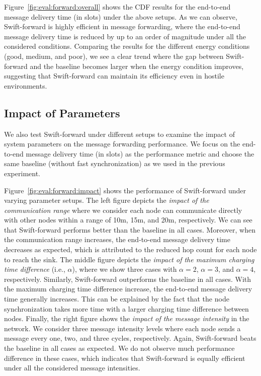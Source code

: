 \documentclass[lettersize,journal]{IEEEtran}
\newcommand{\forward}{Swift-forward\xspace}
\begin{document}
Figure~\ref{fig:eval:forward:overall} shows the CDF results for the end-to-end message delivery time (in slots) under the above setups. As we can observe, \forward is highly efficient in message forwarding, where the end-to-end message delivery time is reduced by up to an order of magnitude under all the considered conditions. Comparing the results for the different energy conditions (good, medium, and poor), we see a clear trend where the gap between \forward and the baseline becomes larger when the energy condition improves, suggesting that \forward can maintain its efficiency even in hostile environments.

\subsection{Impact of Parameters}
We also test \forward under different setups to examine the impact of system parameters on the message forwarding performance. We focus on the end-to-end message delivery time (in slots) as the performance metric and choose the same baseline (without fast synchronization) as we used in the previous experiment. 

Figure~\ref{fig:eval:forward:impact} shows the performance of \forward under varying parameter setups. The left figure depicts the \emph{impact of the communication range} where we consider each node can communicate directly with other nodes within a range of 10m, 15m, and 20m, respectively. We can see that \forward performs better than the baseline in all cases. Moreover, when the communication range increases, the end-to-end message delivery time decreases as expected, which is attributed to the reduced hop count for each node to reach the sink. The middle figure depicts the \emph{impact of the maximum charging time difference} (i.e., $\alpha$), where we show three cases with $\alpha=2$, $\alpha=3$, and $\alpha=4$, respectively. Similarly, \forward outperforms the baseline in all cases. With the maximum charging time difference increase, the end-to-end message delivery time generally increases. This can be explained by the fact that the node synchronization takes more time with a larger charging time difference between nodes. Finally, the right figure shows the \emph{impact of the message intensity} in the network. We consider three message intensity levels where each node sends a message every one, two, and three cycles, respectively. Again, \forward beats the baseline in all cases as expected. We do not observe much performance difference in these cases, which indicates that \forward is equally efficient under all the considered message intensities. 
\end{document}
